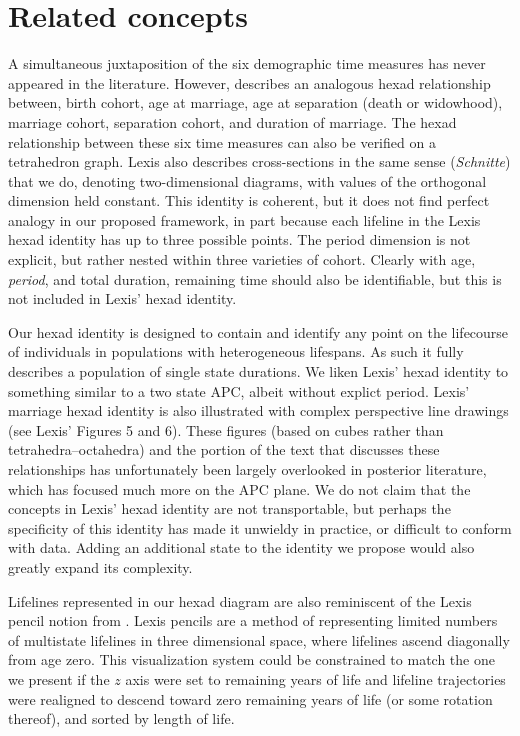 \documentclass[12pt,oneside,a4paper]{article} %
\begin{document}
\FloatBarrier
\section{Related concepts}
A simultaneous juxtaposition of
the six demographic time measures has never appeared in the literature. However,
\citet{lexis1875einleitung} describes an analogous hexad relationship between,
birth cohort, age at marriage, age at separation (death or widowhood), marriage cohort, separation cohort, and
duration of marriage. The hexad relationship between these six
time measures can also be verified on a tetrahedron graph. Lexis also describes
cross-sections in the same sense (\textit{Schnitte}) that we do, denoting
two-dimensional diagrams, with values of the orthogonal dimension held constant.
This identity is coherent, but it does not find perfect
analogy in our proposed framework, in part because each lifeline in the Lexis
hexad identity has up to three possible points. The period dimension is
not explicit, but rather nested within three varieties of cohort.
Clearly with age, \textit{period}, and total duration, remaining
time should also be identifiable, but this is not included in Lexis' hexad
identity. 

Our hexad identity is designed to contain and identify any point on
the lifecourse of individuals in populations with heterogeneous
lifespans. As such it fully describes a population of single state durations.
We liken Lexis' hexad identity to something similar to a two state APC, albeit
without explict period. Lexis' marriage hexad identity is also
illustrated with complex perspective line drawings (see Lexis' Figures 5 and 6).
These figures (based on cubes rather than tetrahedra--octahedra) and the portion of
the text that discusses these relationships has unfortunately been largely
overlooked in posterior literature, which has focused much more on the APC
plane. We do not claim that the concepts in Lexis' hexad
identity are not transportable, but perhaps the specificity of this identity has
made it unwieldy in practice, or difficult to conform with data. Adding an
additional state to the identity we propose would also greatly expand its
complexity.

Lifelines represented in our hexad diagram are also reminiscent of the Lexis
pencil notion from \citet{francis1996visualization}. Lexis pencils are a method of representing
limited numbers of multistate lifelines in three dimensional space, where
lifelines ascend diagonally from age zero. This visualization system could be
constrained to match the one we present if the $z$ axis were set to remaining years of life
and lifeline trajectories were realigned to descend toward zero remaining years
of life (or some rotation thereof), and sorted by length of life.
\end{document}

